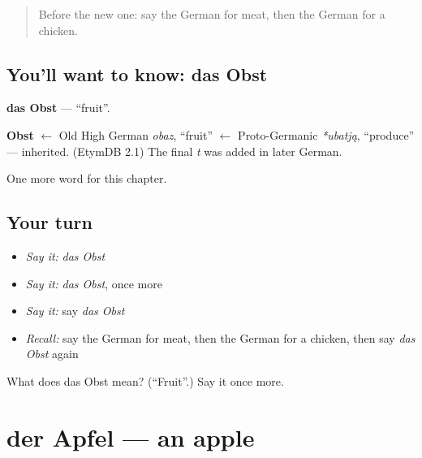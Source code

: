 \label{lesson:GE-C69-obst}



\begin{quote}
Before the new one: say the German for meat, then the German for a chicken.
\end{quote}

\subsection*{You'll want to know: das Obst}
\textbf{das Obst} — \textquotedblleft{}fruit\textquotedblright{}.

\begin{cousinweb}
\textbf{Obst} $\leftarrow$ Old High German \emph{obaz}, \textquotedblleft{}fruit\textquotedblright{} $\leftarrow$ Proto-Germanic \emph{*ubatją}, \textquotedblleft{}produce\textquotedblright{} — inherited. (EtymDB 2.1) The final \emph{t} was added in later German.
\end{cousinweb}

\begin{grammarlens}[title={What you've built}]
One more word for this chapter.
\end{grammarlens}

\subsection*{Your turn}
\begin{itemize}
\raggedright
  \item \emph{Say it:} \emph{das Obst}
  \item \emph{Say it:} \emph{das Obst}, once more
  \item \emph{Say it:} say \emph{das Obst}
  \item \emph{Recall:} say the German for meat, then the German for a chicken, then say \emph{das Obst} again
\end{itemize}

\begin{tcolorbox}[breakable,colback=teal!4,colframe=teal!35!black,title={Before you move on}]
What does das Obst mean? (\textquotedblleft{}Fruit\textquotedblright{}.) Say it once more.
\end{tcolorbox}
\section[der Apfel]{der Apfel — an apple}

\label{lesson:GE-C69-apfel}



